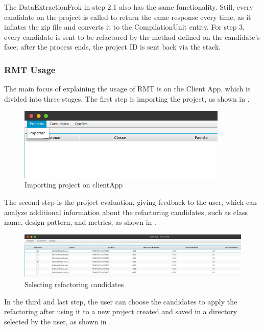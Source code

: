 The DataExtractionFrok in step 2.1 also has the same functionality. Still, every candidate on the project is called to return the same response every time, as it inflates the zip file and converts it to the CompilationUnit entity. For step 3, every candidate is sent to be refactored by the method defined on the candidate's face; after the process ends, the project ID is sent back via the stack.

\subsubsection{RMT Usage}
\label{sub-usage}

The main focus of explaining the usage of RMT is on the Client App, which is divided into three stages. The first step is importing the project, as shown in .

\begin{figure}[ht!]
\SetCaptionWidth{\textwidth}
\caption{Importing project on clientApp}
\label{fig-import}
\includegraphics[width =100mm]{Chapter-2/Figures/import.png}
\end{figure}


The second step is the project evaluation, giving feedback to the user, which can analyze additional information about the refactoring candidates, such as class name, design pattern, and metrics, as shown in .

\begin{figure}[ht!]
\SetCaptionWidth{\textwidth}
\caption{Selecting refactoring candidates}
\label{fig-choose}
\includegraphics[width =\textwidth]{Chapter-2/Figures/choose.png}
\end{figure}

In the third and last step, the user can choose the candidates to apply the refactoring after using it to a new project created and saved in a directory selected by the user, as shown in .

